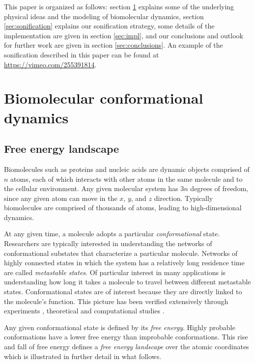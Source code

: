 \documentclass[a4paper,10pt,oneside]{article}
\begin{document}
\begin{sloppy}
This paper is organized as follows: section \ref{sec:biodyn} explains some of the underlying physical ideas and the modeling of biomolecular dynamics, section \ref{sec:sonification} explains our sonification strategy, some details of the implementation are given in section \ref{sec:impl}, and our conclusions and outlook for further work are given in section \ref{sec:conclusions}. An example of the sonification described in this paper can be found at \url{https://vimeo.com/255391814}.

\section{Biomolecular conformational dynamics}
\label{sec:biodyn}
\subsection{Free energy landscape}

Biomolecules such as proteins and nucleic acids are dynamic objects comprised of $n$ atoms, each of which interacts with other atoms in the same molecule and to the cellular environment. Any given molecular system has $3n$ degrees of freedom, since any given atom can move in the $x$, $y$, and $z$ direction. Typically biomolecules are comprised of thousands of atoms, leading to high-dimensional dynamics.

At any given time, a molecule adopts a particular \emph{conformational} state. Researchers are typically interested in understanding the networks of conformational substates that characterize a particular molecule. Networks of highly connected states in which the system has a relatively long residence time are called \emph{metastable states}. Of particular interest in many applications is understanding how long it takes a molecule to travel between different metastable states. Conformational states are of interest because they are directly linked to the molecule's function. This picture \cite{Frauenfelder1598}  has been verified extensively through experiments \cite{Santoso715,Gebhardt2013} , theoretical and computational studies \cite{wales_2004, Buchete2008}.   

Any given conformational state is defined by its \emph{free energy}. Highly probable conformations have a lower free energy than improbable conformations. This rise and fall of free energy defines a \emph{free energy landscape} over the atomic coordinates which is illustrated in further detail in what follows.  


\end{sloppy}
\end{document}
